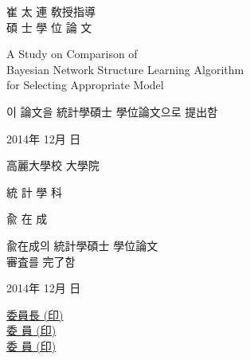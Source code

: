 \documentclass[12pt,a4paper,oneside]{book}
\theoremstyle{plain}
\theoremstyle{definition}
\theoremstyle{remark}
\theoremstyle{definition}
\numberwithin{equation}{chapter}
\begin{document}
\newpage{}
 \linespread{1.0}
 \thispagestyle{empty}
 \vspace{15mm}
 \begin{center}
 {\Large 崔 太 連 敎授指導 \\ 碩 士 學 位 論 文
}
 \end{center}
 \vspace{20mm}
 \begin{center}
  \LARGE A Study on Comparison of\\ Bayesian Network Structure Learning Algorithm\\ for Selecting Appropriate Model
 \end{center}
 \vspace{20mm}
 \begin{center}
 {\Large 이 論文을 統計學碩士 學位論文으로 提出함}
 \end{center}
 \vspace{15mm}
 \begin{center}
 {\Large 2014年 \quad 12月 \quad 日}
 \end{center}
 \vspace{20mm}
 \begin{center}
 {\Large 高麗大學校 大學院}
 \end{center}
 \begin{center}
  {\Large 統 計 學 科}
 \end{center}
 \begin{center}
 {\Large 兪 \quad\quad 在 \quad\quad 成}
 \end{center}
 \linespread{1.6}





\newpage{}		
 \linespread{1.0}
 \thispagestyle{empty}
 \vspace{20mm}
 \begin{center}
 {\LARGE 兪在成의 統計學碩士 學位論文 \\ 審査를 完了함}
 \end{center}
 \vspace{50mm}
 \begin{center}
{\Large 2014年 \quad 12月 \quad 日}
 \end{center}
 \vspace{55mm}
 \begin{center}
 {\Large  \underline{委員長 \hspace{60mm} (印)} \\ \vspace{7mm}
          \underline{委 \quad 員\hspace{60mm} (印)} \\ \vspace{7mm}
          \underline{委 \quad 員\hspace{60mm} (印)} \\ }
 \end{center}
 \linespread{1.6}
\end{document}
